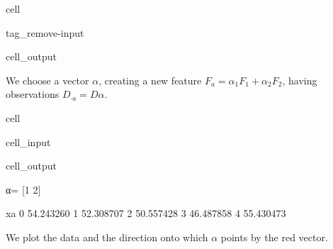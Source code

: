 \documentclass[letterpaper,10pt,english]{jupyterBook}
\begin{document}
\begin{sphinxuseclass}{cell}
\begin{sphinxuseclass}{tag_remove-input}\begin{sphinxVerbatimOutput}

\begin{sphinxuseclass}{cell_output}
\noindent{}

\end{sphinxuseclass}\end{sphinxVerbatimOutput}

\end{sphinxuseclass}
\end{sphinxuseclass}
\sphinxAtStartPar
We choose a vector \(\alpha\), creating a new feature \(F_a = \alpha_1F_1+\alpha_2F_2\), having observations \(D_{\cdot a} = D\alpha\).

\begin{sphinxuseclass}{cell}\begin{sphinxVerbatimInput}

\begin{sphinxuseclass}{cell_input}
\begin{sphinxVerbatim}[commandchars=\\\{\}]
  \PYG{p}{[}\PYG{p}{]}
  
\end{sphinxVerbatim}

\end{sphinxuseclass}\end{sphinxVerbatimInput}
\begin{sphinxVerbatimOutput}

\begin{sphinxuseclass}{cell_output}
\begin{sphinxVerbatim}[commandchars=\\\{\}]
α= [1 2]
\end{sphinxVerbatim}

\begin{sphinxVerbatim}[commandchars=\\\{\}]
       \PYGZdl{}x\PYGZus{}a\PYGZdl{}
0  54.243260
1  52.308707
2  50.557428
3  46.487858
4  55.430473
\end{sphinxVerbatim}

\end{sphinxuseclass}\end{sphinxVerbatimOutput}

\end{sphinxuseclass}
\sphinxAtStartPar
We plot the data and the direction onto which \(\alpha\) points by the red vector.
\end{document}
